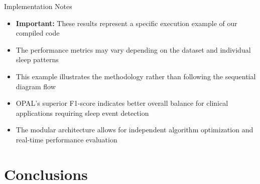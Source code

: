 \documentclass[10pt]{beamer} %
\begin{document}
\begin{frame}{Implementation Notes}
\begin{itemize}
  \item \footnotesize \textbf{Important:} These results represent a specific execution example of our compiled code
  \item \footnotesize The performance metrics may vary depending on the dataset and individual sleep patterns
  \item \footnotesize This example illustrates the methodology rather than following the sequential diagram flow
  \item \footnotesize OPAL's superior F1-score indicates better overall balance for clinical applications requiring sleep event detection
  \item \footnotesize The modular architecture allows for independent algorithm optimization and real-time performance evaluation
\end{itemize}
\end{frame}

\section{Conclusions}
\end{document}
